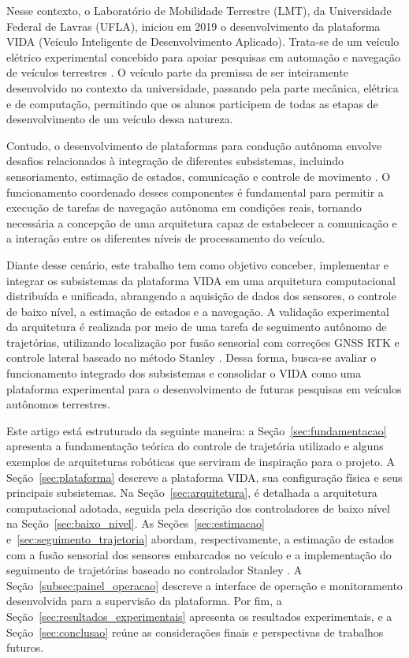 Nesse contexto, o Laboratório de Mobilidade Terrestre (LMT), da Universidade Federal de Lavras (UFLA), iniciou em 2019 o desenvolvimento da plataforma VIDA (Veículo Inteligente de Desenvolvimento Aplicado). Trata-se de um veículo elétrico experimental concebido para apoiar pesquisas em automação e navegação de veículos terrestres \citep{Silva2024CIUFLA}. O veículo parte da premissa de ser inteiramente desenvolvido no contexto da universidade, passando pela parte mecânica, elétrica e de computação, permitindo que os alunos participem de todas as etapas de desenvolvimento de um veículo dessa natureza.

Contudo, o desenvolvimento de plataformas para condução autônoma envolve desafios relacionados à integração de diferentes subsistemas, incluindo sensoriamento, estimação de estados, comunicação e controle de movimento \citep{Badue2021,Zhao2024,Kato2018}. O funcionamento coordenado desses componentes é fundamental para permitir a execução de tarefas de navegação autônoma em condições reais, tornando necessária a concepção de uma arquitetura capaz de estabelecer a comunicação e a interação entre os diferentes níveis de processamento do veículo.

Diante desse cenário, este trabalho tem como objetivo conceber, implementar e integrar os subsistemas da plataforma VIDA em uma arquitetura computacional distribuída e unificada, abrangendo a aquisição de dados dos sensores, o controle de baixo nível, a estimação de estados e a navegação. A validação experimental da arquitetura é realizada por meio de uma tarefa de seguimento autônomo de trajetórias, utilizando localização por fusão sensorial com correções GNSS RTK e controle lateral baseado no método Stanley \citep{Thrun2006,Hoffmann2007}. Dessa forma, busca-se avaliar o funcionamento integrado dos subsistemas e consolidar o VIDA como uma plataforma experimental para o desenvolvimento de futuras pesquisas em veículos autônomos terrestres.

Este artigo está estruturado da seguinte maneira: a Seção~\ref{sec:fundamentacao} apresenta a fundamentação teórica do controle de trajetória utilizado e alguns exemplos de arquiteturas robóticas que serviram de inspiração para o projeto. A  Seção~\ref{sec:plataforma} descreve a plataforma VIDA, sua configuração física e seus principais subsistemas. Na Seção~\ref{sec:arquitetura}, é detalhada a arquitetura computacional adotada, seguida pela descrição dos controladores de baixo nível na Seção~\ref{sec:baixo_nivel}. As Seções~\ref{sec:estimacao} e~\ref{sec:seguimento_trajetoria} abordam, respectivamente, a estimação de estados com a fusão sensorial dos sensores embarcados no veículo e a implementação do seguimento de trajetórias baseado no controlador Stanley \citep{Hoffmann2007}. A Seção~\ref{subsec:painel_operacao} descreve a interface de operação e monitoramento desenvolvida para a supervisão da plataforma. Por fim, a Seção~\ref{sec:resultados_experimentais} apresenta os resultados experimentais, e a Seção~\ref{sec:conclusao} reúne as considerações finais e perspectivas de trabalhos futuros. 